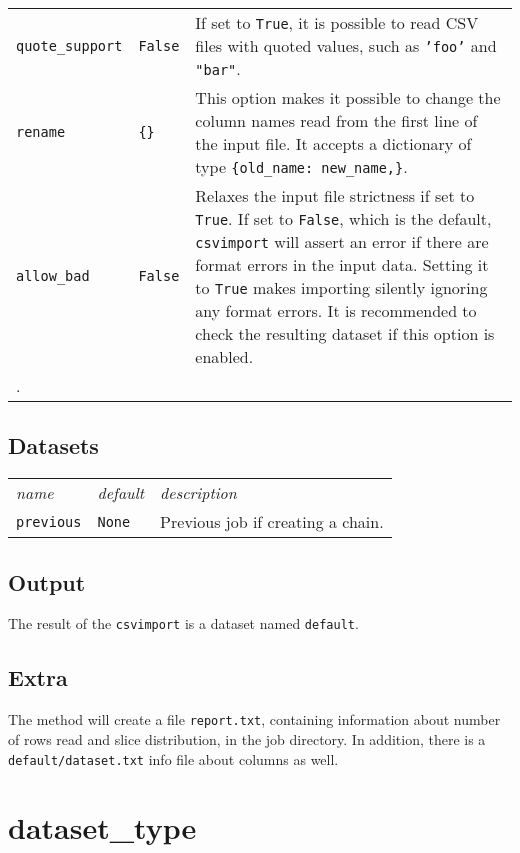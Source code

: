 \begin{tabular}{ p{3.2cm} p{1.8cm} p{10cm}}
  \texttt{quote\_support} & \texttt{False} & If set to \texttt{True},
  it is possible to read CSV files with quoted values, such as
  \texttt{'foo'} and \texttt{"bar"}.\\[1ex]

  \texttt{rename} & \texttt{\{\}} & This option makes it possible to
  change the column names read from the first line of the input file.
  It accepts a dictionary of type
  \texttt{\{old\_name:\ new\_name,\}}.\\[1ex]

  \texttt{allow\_bad} & \texttt{False} & Relaxes the input file
  strictness if set to \texttt{True}.  If set to \texttt{False}, which
  is the default, \texttt{csvimport} will assert an error if there are
  format errors in the input data.  Setting it to \texttt{True} makes
  importing silently ignoring any format errors.  It is recommended to
  check the resulting dataset if this option is enabled.\\[1ex].
\end{tabular}


\subsection{Datasets}
\begin{tabular}{ p{3.2cm} p{1.8cm} p{10cm}}
  \textsl{name} & \textsl{default} & \textsl{description}\\[2ex]
  \texttt{previous} & \texttt{None} & Previous job if creating a chain.
\end{tabular}

\subsection{Output}
The result of the \texttt{csvimport} is a dataset named
\texttt{default}.

\subsection{Extra}
The method will create a file \texttt{report.txt}, containing
information about number of rows read and slice distribution, in the
job directory.  In addition, there is a \texttt{default/dataset.txt}
info file about columns as well.






\clearpage
\section{dataset\_type}

